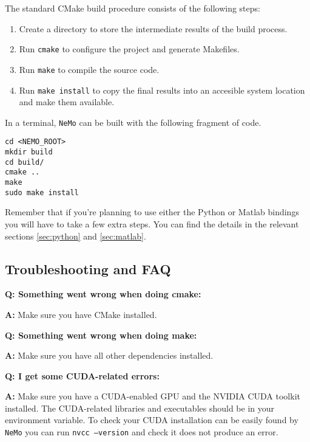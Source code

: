 \documentclass[a4paper]{article}
\newenvironment{mintframe}
  {\begin{mdframed}[linecolor=black, topline=true, bottomline=true,
    leftline=false, rightline=false, backgroundcolor=yellow!13!white,
    nobreak=true]
  }{
  \end{mdframed}
}
\newcommand{\nemo}{\texttt{NeMo}\xspace}
\newcommand{\code}[1]{\texttt{#1}}
\newcommand{\command}[1]{\texttt{#1}}
\begin{document}
The standard CMake build procedure consists of the following steps:

\begin{enumerate}

  \item Create a directory to store the intermediate results of the build
  process.

  \item Run \code{cmake} to configure the project and generate Makefiles.

  \item Run \code{make} to compile the source code.

  \item Run \code{make install} to copy the final results into an accesible
  system location and make them available.

\end{enumerate}

In a terminal, \nemo can be built with the following fragment of code.

\begin{mintframe}
\begin{verbatim}
cd <NEMO_ROOT>
mkdir build
cd build/
cmake ..
make
sudo make install
\end{verbatim}
\end{mintframe}

Remember that if you're planning to use either the Python or Matlab bindings
you will have to take a few extra steps. You can find the details in the
relevant sections \ref{sec:python} and \ref{sec:matlab}.


\subsection{Troubleshooting and FAQ}
\label{sec:faq}

\textbf{Q: Something went wrong when doing cmake:}

\textbf{A:} Make sure you have CMake installed.

\vspace{5pt}
\textbf{Q: Something went wrong when doing make:}

\textbf{A:} Make sure you have all other dependencies installed.

\vspace{5pt}
\textbf{Q: I get some CUDA-related errors:}

\textbf{A:} Make sure you have a CUDA-enabled GPU and the NVIDIA CUDA toolkit
installed. The CUDA-related libraries and executables should be in your
\verb@PATH@ environment variable. To check your CUDA installation can be easily
found by \nemo you can run \command{nvcc --version} and check it does not
produce an error.
\end{document}
